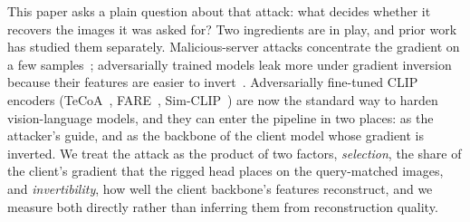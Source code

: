 This paper asks a plain question about that attack: what decides whether it recovers the images it was asked for?
Two ingredients are in play, and prior work has studied them separately.
Malicious-server attacks concentrate the gradient on a few samples~\cite{fishing2023,robbing2022}; adversarially trained models leak more under gradient inversion because their features are easier to invert~\cite{zhang2022privacyat,mejia2019robustorprivate,torp2026nonrobust}.
Adversarially fine-tuned CLIP encoders (TeCoA~\cite{tecoa2023}, FARE~\cite{fare2024}, Sim-CLIP~\cite{simclip2024}) are now the standard way to harden vision-language models, and they can enter the \geminio pipeline in two places: as the attacker's guide, and as the backbone of the client model whose gradient is inverted.
We treat the attack as the product of two factors, \emph{selection}, the share of the client's gradient that the rigged head places on the query-matched images, and \emph{invertibility}, how well the client backbone's features reconstruct, and we measure both directly rather than inferring them from reconstruction quality.

